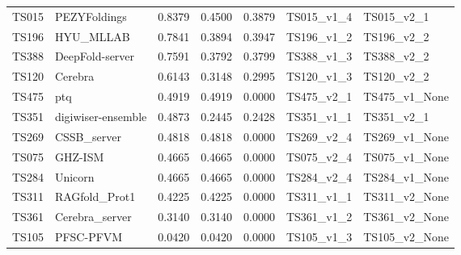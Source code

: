\begin{table}[ht]
{\begin{tabular}{llrrrll}
TS015 & PEZYFoldings & 0.8379 & 0.4500 & 0.3879 & TS015\_v1\_4 & TS015\_v2\_1 \\ 
TS196 & HYU\_MLLAB & 0.7841 & 0.3894 & 0.3947 & TS196\_v1\_2 & TS196\_v2\_2 \\ 
TS388 & DeepFold-server & 0.7591 & 0.3792 & 0.3799 & TS388\_v1\_3 & TS388\_v2\_2 \\ 
TS120 & Cerebra & 0.6143 & 0.3148 & 0.2995 & TS120\_v1\_3 & TS120\_v2\_2 \\ 
TS475 & ptq & 0.4919 & 0.4919 & 0.0000 & TS475\_v2\_1 & TS475\_v1\_None \\ 
TS351 & digiwiser-ensemble & 0.4873 & 0.2445 & 0.2428 & TS351\_v1\_1 & TS351\_v2\_1 \\ 
TS269 & CSSB\_server & 0.4818 & 0.4818 & 0.0000 & TS269\_v2\_4 & TS269\_v1\_None \\ 
TS075 & GHZ-ISM & 0.4665 & 0.4665 & 0.0000 & TS075\_v2\_4 & TS075\_v1\_None \\ 
TS284 & Unicorn & 0.4665 & 0.4665 & 0.0000 & TS284\_v2\_4 & TS284\_v1\_None \\ 
TS311 & RAGfold\_Prot1 & 0.4225 & 0.4225 & 0.0000 & TS311\_v1\_1 & TS311\_v2\_None \\ 
TS361 & Cerebra\_server & 0.3140 & 0.3140 & 0.0000 & TS361\_v1\_2 & TS361\_v2\_None \\ 
TS105 & PFSC-PFVM & 0.0420 & 0.0420 & 0.0000 & TS105\_v1\_3 & TS105\_v2\_None \\ 
\bottomrule
\end{tabular}%
}
\end{table}
